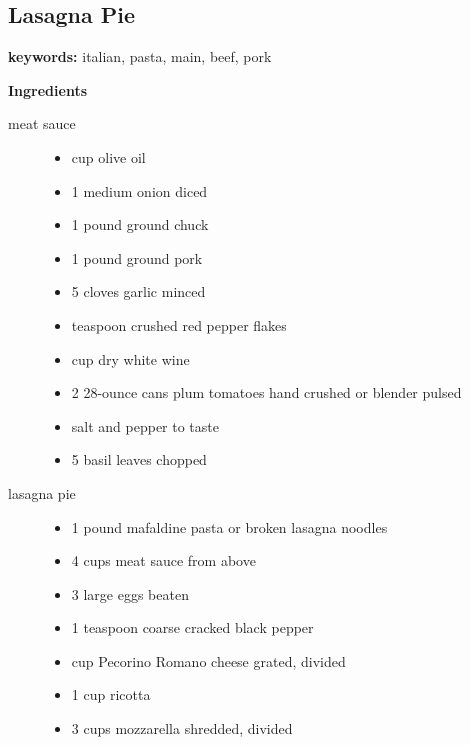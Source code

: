 \documentclass[web-recipes.tex]{subfiles}
\begin{document}
\renewcommand{\mytitle}{Lasagna Pie}
\renewcommand{\myurl}{https://www.sipandfeast.com/lasagna-pie/}
\begin{mdframed}[nobreak]
  \section{\mytitle}
  {\sffamily\footnotesize \textbf{keywords:}
  italian, pasta, main, beef, pork } \vspace{0.5ex}

  \begin{minipage}[t]{0.35\textwidth}
    {\sffamily\bfseries Ingredients}\vspace{0.5ex}
    \begin{description}
      \item[meat sauce] \hfill
        \begin{itemize}
          \item {} cup olive oil
          \item 1 medium onion diced
          \item 1 pound ground chuck
          \item 1 pound ground pork
          \item 5 cloves garlic minced
          \item {} teaspoon crushed red pepper flakes
          \item {} cup dry white wine
          \item 2 28-ounce cans plum tomatoes hand crushed or blender pulsed
          \item salt and pepper to taste
          \item 5 basil leaves chopped
        \end{itemize}
      \item[lasagna pie] \hfill
        \begin{itemize}
          \item 1 pound mafaldine pasta or broken lasagna noodles
          \item 4 cups meat sauce from above
          \item 3 large eggs beaten
          \item 1 teaspoon coarse cracked black pepper
          \item {} cup Pecorino Romano cheese grated, divided
          \item 1 cup ricotta
          \item 3 cups mozzarella shredded, divided

\end{itemize}
\end{description}
\end{minipage}
\end{mdframed}
\end{document}
